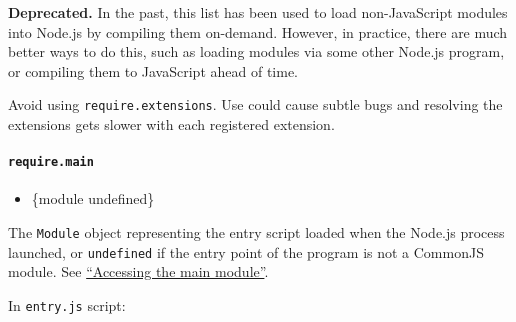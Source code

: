\begin{Shaded}
\begin{Highlighting}[]
\NormalTok{[}\NormalTok{] }\OperatorTok{=}\NormalTok{[}\NormalTok{]}\OperatorTok{;}
\end{Highlighting}
\end{Shaded}

\textbf{Deprecated.} In the past, this list has been used to load
non-JavaScript modules into Node.js by compiling them on-demand.
However, in practice, there are much better ways to do this, such as
loading modules via some other Node.js program, or compiling them to
JavaScript ahead of time.

Avoid using \texttt{require.extensions}. Use could cause subtle bugs and
resolving the extensions gets slower with each registered extension.

\paragraph{\texorpdfstring{\texttt{require.main}}{require.main}}\label{require.main}

\begin{itemize}
\tightlist
\item
  \{module \textbar{} undefined\}
\end{itemize}

The \texttt{Module} object representing the entry script loaded when the
Node.js process launched, or \texttt{undefined} if the entry point of
the program is not a CommonJS module. See
\hyperref[accessing-the-main-module]{``Accessing the main module''}.

In \texttt{entry.js} script:

\begin{Shaded}
\begin{Highlighting}[]
\NormalTok{)}\OperatorTok{;}
\end{Highlighting}
\end{Shaded}

\begin{Shaded}
\begin{Highlighting}[]
\end{Highlighting}
\end{Shaded}

